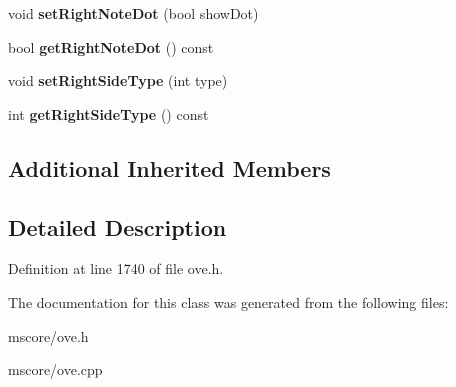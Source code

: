 \begin{DoxyCompactItemize}
\item 
\mbox{\label{class_o_v_e_1_1_tempo_a1917224a5821788073e915804861aa9a}} 
void {\bfseries set\+Right\+Note\+Dot} (bool show\+Dot)
\item 
\mbox{\label{class_o_v_e_1_1_tempo_a4924b8b7dc4579ee9ab3c0f064fc4bd7}} 
bool {\bfseries get\+Right\+Note\+Dot} () const
\item 
\mbox{\label{class_o_v_e_1_1_tempo_ac654b5494670bf0c8dc4ff2bea9b0b9d}} 
void {\bfseries set\+Right\+Side\+Type} (int type)
\item 
\mbox{\label{class_o_v_e_1_1_tempo_ad680489bcddf17a12638f4b920d49f2b}} 
int {\bfseries get\+Right\+Side\+Type} () const
\end{DoxyCompactItemize}
\subsection*{Additional Inherited Members}


\subsection{Detailed Description}


Definition at line 1740 of file ove.\+h.



The documentation for this class was generated from the following files\+:\begin{DoxyCompactItemize}
\item 
mscore/ove.\+h\item 
mscore/ove.\+cpp\end{DoxyCompactItemize}

